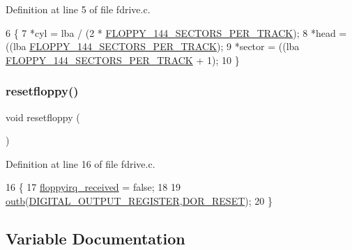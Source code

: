 Definition at line 5 of file fdrive.\+c.


\begin{DoxyCode}
6 \{
7     *cyl    = lba / (2 * \hyperlink{a00020_a04d40064bde801f12fb73134cf328150_a04d40064bde801f12fb73134cf328150}{FLOPPY\_144\_SECTORS\_PER\_TRACK});
8     *head   = ((lba %
      \hyperlink{a00020_a04d40064bde801f12fb73134cf328150_a04d40064bde801f12fb73134cf328150}{FLOPPY\_144\_SECTORS\_PER\_TRACK});
9     *sector = ((lba %
      \hyperlink{a00020_a04d40064bde801f12fb73134cf328150_a04d40064bde801f12fb73134cf328150}{FLOPPY\_144\_SECTORS\_PER\_TRACK} + 1);
10 \}
\end{DoxyCode}
\mbox{\label{a00020_ad64d38a767bc5f30a3e13a5b01b9cf35_ad64d38a767bc5f30a3e13a5b01b9cf35}} 
\subsubsection{\texorpdfstring{resetfloppy()}{resetfloppy()}}
{\footnotesize\ttfamily void resetfloppy (\begin{DoxyParamCaption}{ }\end{DoxyParamCaption})}



Definition at line 16 of file fdrive.\+c.


\begin{DoxyCode}
16                    \{
17     \hyperlink{a00020_a2cfa75d25a7da8cb54551c7840e80d40_a2cfa75d25a7da8cb54551c7840e80d40}{floppyirq\_received} = \textcolor{keyword}{false};
18 
19     \hyperlink{a00113_aa37f5841c54156a4b14fc0d6f626b44f_aa37f5841c54156a4b14fc0d6f626b44f}{outb}(\hyperlink{a00020_a203a664e6f1b58c27efb4db8ff9db144_a203a664e6f1b58c27efb4db8ff9db144a9767b7f5f447d5346411d03077fea82a}{DIGITAL\_OUTPUT\_REGISTER},\hyperlink{a00020_a6ef9f5776b2d959e47c6c42111900071_a6ef9f5776b2d959e47c6c42111900071}{DOR\_RESET});
20 \}
\end{DoxyCode}


\subsection{Variable Documentation}
\mbox{\label{a00020_a2cfa75d25a7da8cb54551c7840e80d40_a2cfa75d25a7da8cb54551c7840e80d40}} 
